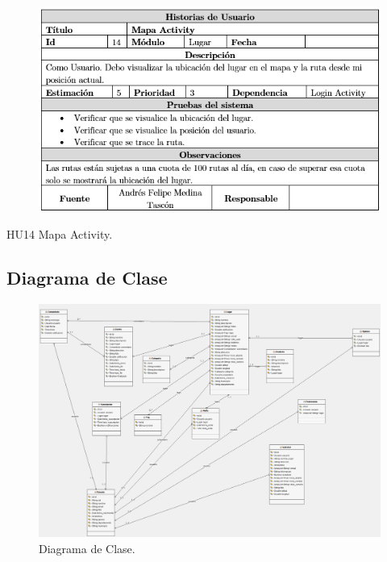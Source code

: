 \documentclass[12pt,letterpaper,openany]{book}
\begin{document}
\begin{table}[H]
\begin{center}
\begin{figure}[H]
\begin{center}
\includegraphics[width=13cm]{./imagenes/HU/HU14}
\end{center}
\end{figure}
\end{center}
\caption{HU14 Mapa Activity.}
\end{table}

\subsection{Diagrama de Clase}
\begin{figure}[H]
\begin{center}
\includegraphics[width=16cm]{./imagenes/Diagrama_UML}
\caption{Diagrama de Clase.}
\end{center}
\end{figure}
\end{document}
